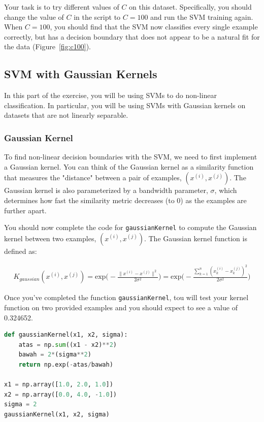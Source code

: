 \documentclass[12pt]{article}
\begin{document}
Your task is to try different values of $C$ on this dataset. Specifically, you should change the value of $C$ in the script to $C = 100$ and run the SVM training again. When $C = 100$, you should find that the SVM now classifies every single example correctly, but has a decision boundary that does not appear to be a natural fit for the data (Figure~\ref{fig:c100}).

\subsection{SVM with Gaussian Kernels}

In this part of the exercise, you will be using SVMs to do non-linear classification. In particular, you will be using SVMs with Gaussian kernels on datasets that are not linearly separable.

\subsubsection{Gaussian Kernel}

To find non-linear decision boundaries with the SVM, we need to first implement a Gaussian kernel. You can think of the Gaussian kernel as a similarity function that measures the "distance" between a pair of examples, $(x^{(i)}, x^{(j)})$. The Gaussian kernel is also parameterized by a bandwidth parameter, $\sigma$, which determines how fast the similarity metric decreases (to 0) as the examples are further apart.

You should now complete the code for \texttt{gaussianKernel} to compute the Gaussian kernel between two examples, $(x^{(i)}, x^{(j)})$. The Gaussian kernel function is defined as:

\begin{align}
  K_{gaussian}(x^{(i)}, x^{(j)}) = \text{exp} \bigg( -\frac{\|x^{(i)} - x^{(j)}\|^2}{2 \sigma^2} \bigg)
  = \text{exp} \Bigg(- \frac{\sum_{k=1}^n{(x_k^{(i)} - x_k^{(j)})^2}}{2 \sigma^2} \Bigg)
\end{align}

Once you’ve completed the function \texttt{gaussianKernel}, tou will test your kernel function on two provided examples and you should expect to see a value of 0.324652.

\begin{lstlisting}[language=Python]
def gaussianKernel(x1, x2, sigma):
    atas = np.sum((x1 - x2)**2)
    bawah = 2*(sigma**2)
    return np.exp(-atas/bawah)

x1 = np.array([1.0, 2.0, 1.0])
x2 = np.array([0.0, 4.0, -1.0])
sigma = 2
gaussianKernel(x1, x2, sigma)
\end{lstlisting}
\end{document}
